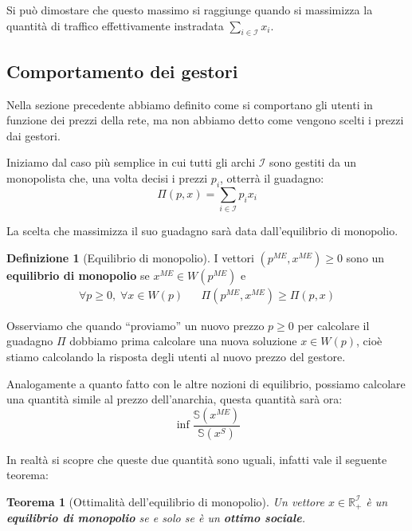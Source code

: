 \documentclass[a4paper]{article}
\newcounter{counter1}
\theoremstyle{plain}
\newtheorem{myteo}[counter1]{Teorema}
\theoremstyle{definition}
\newtheorem{mydef}[counter1]{Definizione}
\theoremstyle{remark}
\newcommand{\pa}[1]{\left(#1\right)}
\begin{document}
Si può dimostare che questo massimo si raggiunge quando si massimizza
la quantità di traffico effettivamente instradata $\sum _{i\in
  \mathcal{I}} x_i$.

\subsection{Comportamento dei gestori}
\label{sec:prezzi-gestori}

Nella sezione precedente abbiamo definito come si comportano gli
utenti in funzione dei prezzi della rete, ma non abbiamo detto come
vengono scelti i prezzi dai gestori.

Iniziamo dal caso più semplice in cui tutti gli archi $\mathcal{I}$
sono gestiti da un monopolista che, una volta decisi i prezzi $p_i$,
otterrà il guadagno:
\[ \Pi (p,x) = \sum _{i\in\mathcal{I}} p_i x_i \]

La scelta che massimizza il suo guadagno sarà data dall'equilibrio di
monopolio.
\begin{mydef}[Equilibrio di monopolio]
  I vettori $\pa{p^{ME},x^{ME}}\ge 0$ sono un \textbf{equilibrio di
    monopolio} se $x^{ME}\in W(p^{ME})$ e 
  \begin{align*}
    \forall p\ge 0,\; \forall x\in W(p) && \Pi \pa{p^{ME},x^{ME}}
                                           \ge \Pi \pa{p,x}
  \end{align*}
\end{mydef}

Osserviamo che quando ``proviamo'' un nuovo prezzo $p\ge 0$ per
calcolare il guadagno $\Pi$ dobbiamo prima calcolare una nuova
soluzione $x\in W\pa{p}$, cioè stiamo calcolando la risposta degli
utenti al nuovo prezzo del gestore.

Analogamente a quanto fatto con le altre nozioni di equilibrio,
possiamo calcolare una quantità simile al prezzo dell'anarchia, questa
quantità sarà ora:
\[ \inf \frac{\mathbb{S}\pa{x^{ME}}}{\mathbb{S}\pa{x^S}} \]

In realtà si scopre che queste due quantità sono uguali, infatti vale
il seguente teorema:

\begin{myteo}[Ottimalità dell'equilibrio di
  monopolio{\cite[Proposizione 3.2]{acemoglu2007-2}}]
  Un vettore $x\in \mathbb{R}_+^\mathcal{I}$ è un \textbf{equilibrio
    di monopolio} se e solo se è un \textbf{ottimo sociale}.
\end{myteo}
\end{document}
